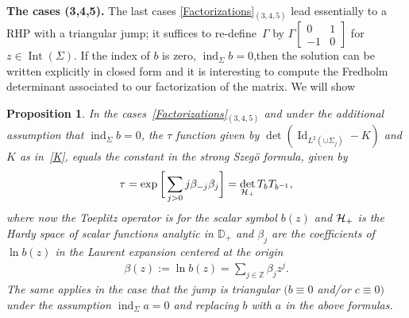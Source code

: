 \documentclass[pdftex]{sigma}
\numberwithin{equation}{section}
\newtheorem{Proposition}[Theorem]{Proposition}
 { \theoremstyle{definition}
\newtheorem{Remark}[Theorem]{Remark} }
\def\D{\mathbb D}
\def\H{{\cal H}}
\def\Z{{\mathbb Z}}
\begin{document}
{\bf The cases (3,4,5).} The last cases \eqref{Factorizations}$_{{(3,4,5)}}$ lead essentially to a RHP with a triangular jump; it suf\/f\/ices to re-def\/ine~$\Gamma$ by $\Gamma \left[\begin{smallmatrix}
0 & 1\\-1 & 0
\end{smallmatrix}\right] $ for $z\in \operatorname{Int}(\Sigma)$. If the index of $b$ is zero, $\operatorname{ind}_\Sigma b=0$,then the solution can be written explicitly in closed form and it is interesting to compute the Fredholm determinant associated to our factorization of the matrix. We will show
\begin{Proposition}
In the cases~\eqref{Factorizations}$_{{(3,4,5)}}$ and under the additional assumption that $\operatorname{ind}_\Sigma b=0$, the $\tau$ function given by $\det (\operatorname{Id}_{L^2(\cup\Sigma_j)} - K)$ and $K$ as in~\eqref{K}, equals the constant in the strong Szeg\"o formula, given by {\rm \cite{BasorWidom-BO, BorodinOkounkov}}
\begin{gather*}
\tau = \exp \bigg[ \sum_{j>0} j \beta_{-j} \beta_j\bigg] = \det_{\H_+} T_b T_{b^{-1}},
\end{gather*}
 where now the Toeplitz operator is for the scalar symbol $b(z)$ and $\H_+$ is the Hardy space of scalar functions analytic in $\D_+$ and $\beta_j$ are the coefficients of $\ln b(z)$ in the Laurent expansion centered at the origin
 \begin{gather}
\beta(z):= \ln b(z) = \sum_{j\in \Z} \beta_j z^{j}.\label{Laurent}
 \end{gather}
The same applies in the case that the jump is triangular $(b\equiv 0$ and/or $c\equiv 0)$ under the assumption $\operatorname{ind}_\Sigma a=0$ and replacing $b$ with $a$ in the above formulas.
\end{Proposition}
\end{document}
